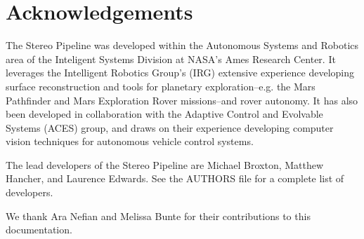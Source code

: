 \chapter*{Acknowledgements}

The Stereo Pipeline was developed within the Autonomous Systems and
Robotics area of the Inteligent Systems Division at NASA's Ames
Research Center.  It leverages the Intelligent Robotics Group's
(IRG) extensive experience developing surface reconstruction and
tools for planetary exploration--e.g. the Mars Pathfinder and Mars
Exploration Rover missions--and rover autonomy.  It has also been
developed in collaboration with the Adaptive Control and Evolvable
Systems (ACES) group, and draws on their experience developing
computer vision techniques for autonomous vehicle control systems.

The lead developers of the Stereo Pipeline are Michael Broxton,
Matthew Hancher, and Laurence Edwards.  See the AUTHORS file for a
complete list of developers.

We thank Ara Nefian and Melissa Bunte for their contributions to this documentation.
